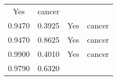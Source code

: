 \documentclass[12pt,]{article}
\begin{document}
\begin{longtable}[]{@{}cccc@{}}
\begin{minipage}[t]{0.22\columnwidth}
Yes\strut
\end{minipage} & \begin{minipage}[t]{0.16\columnwidth}\centering\strut
cancer\strut
\end{minipage}\tabularnewline
\begin{minipage}[t]{0.24\columnwidth}\centering\strut
0.9470\strut
\end{minipage} & \begin{minipage}[t]{0.26\columnwidth}\centering\strut
0.3925\strut
\end{minipage} & \begin{minipage}[t]{0.22\columnwidth}\centering\strut
Yes\strut
\end{minipage} & \begin{minipage}[t]{0.16\columnwidth}\centering\strut
cancer\strut
\end{minipage}\tabularnewline
\begin{minipage}[t]{0.24\columnwidth}\centering\strut
0.9470\strut
\end{minipage} & \begin{minipage}[t]{0.26\columnwidth}\centering\strut
0.8625\strut
\end{minipage} & \begin{minipage}[t]{0.22\columnwidth}\centering\strut
Yes\strut
\end{minipage} & \begin{minipage}[t]{0.16\columnwidth}\centering\strut
cancer\strut
\end{minipage}\tabularnewline
\begin{minipage}[t]{0.24\columnwidth}\centering\strut
0.9900\strut
\end{minipage} & \begin{minipage}[t]{0.26\columnwidth}\centering\strut
0.4010\strut
\end{minipage} & \begin{minipage}[t]{0.22\columnwidth}\centering\strut
Yes\strut
\end{minipage} & \begin{minipage}[t]{0.16\columnwidth}\centering\strut
cancer\strut
\end{minipage}\tabularnewline
\begin{minipage}[t]{0.24\columnwidth}\centering\strut
0.9790\strut
\end{minipage} & \begin{minipage}[t]{0.26\columnwidth}\centering\strut
0.6320\strut
\end{minipage} & \begin{minipage}[t]{0.22\columnwidth}\centering\strut

\end{minipage}
\end{longtable}
\end{document}
